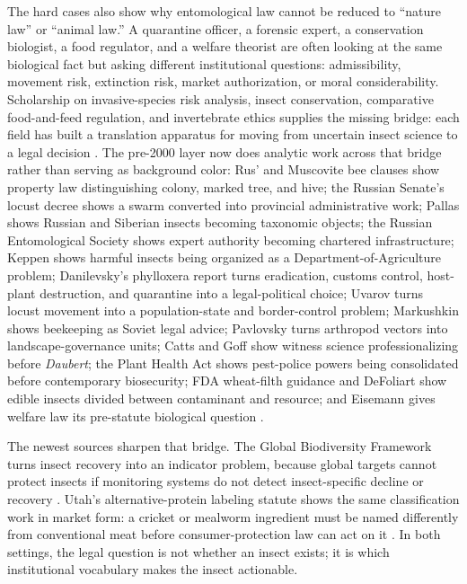 \documentclass[
  english,
]{article}
\begin{document}
The hard cases also show why entomological law cannot be reduced to
``nature law'' or ``animal law.'' A quarantine officer, a forensic
expert, a conservation biologist, a food regulator, and a welfare
theorist are often looking at the same biological fact but asking
different institutional questions: admissibility, movement risk,
extinction risk, market authorization, or moral considerability.
Scholarship on invasive-species risk analysis, insect conservation,
comparative food-and-feed regulation, and invertebrate ethics supplies
the missing bridge: each field has built a translation apparatus for
moving from uncertain insect science to a legal decision
\citep{lodge2016bioeconomics_invasive_species, lugo2006insect_conservation_esa, lahteenmaki2021insectfoodfeed, mikhalevich2020minds}.
The pre-2000 layer now does analytic work across that bridge rather than
serving as background color: Rus' and Muscovite bee clauses show
property law distinguishing colony, marked tree, and hive; the Russian
Senate's locust decree shows a swarm converted into provincial
administrative work; Pallas shows Russian and Siberian insects becoming
taxonomic objects; the Russian Entomological Society shows expert
authority becoming chartered infrastructure; Keppen shows harmful
insects being organized as a Department-of-Agriculture problem;
Danilevsky's phylloxera report turns eradication, customs control,
host-plant destruction, and quarantine into a legal-political choice;
Uvarov turns locust movement into a population-state and border-control
problem; Markushkin shows beekeeping as Soviet legal advice; Pavlovsky
turns arthropod vectors into landscape-governance units; Catts and Goff
show witness science professionalizing before \emph{Daubert}; the Plant
Health Act shows pest-police powers being consolidated before
contemporary biosecurity; FDA wheat-filth guidance and DeFoliart show
edible insects divided between contaminant and resource; and Eisemann
gives welfare law its pre-statute biological question
\citep{ruskaia_pravda_bees, sobornoe_ulozhenie1649_bees, russian_senate1749_locust_belgorod, pallas1781_icones_insectorum, russian_entomological_society1864_charter, keppen1881_harmful_insects, danilevsky1882_phylloxera, uvarov1921_locusta_phase, snk_locust_afghanistan1934, markushkin1927_beekeeper_legal_handbook, pavlovsky1939_natural_focality, pavlovsky1946_vector_nidality, catts_goff1992_forensic_entomology, uk_plant_health1967, fda_cpg_wheat_filth1988, defoliart1999_insects_as_food, eisemann1984_insect_pain}.

The newest sources sharpen that bridge. The Global Biodiversity
Framework turns insect recovery into an indicator problem, because
global targets cannot protect insects if monitoring systems do not
detect insect-specific decline or recovery
\citep{cbd_gbf2022, bladon2026gbf_insect_conservation}. Utah's
alternative-protein labeling statute shows the same classification work
in market form: a cricket or mealworm ingredient must be named
differently from conventional meat before consumer-protection law can
act on it \citep{utah_hb138_2025}. In both settings, the legal question
is not whether an insect exists; it is which institutional vocabulary
makes the insect actionable.
\end{document}
